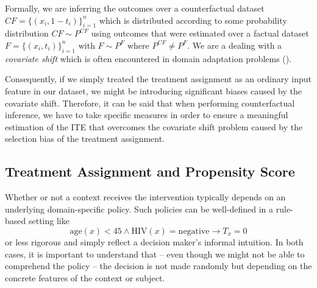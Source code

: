 
Formally, we are inferring the outcomes over a counterfactual dataset $CF = \{(x_i, 1 - t_i) \}^{n}_{i=1}$ which is distributed according to some probability distribution $CF \sim P^{CF}$ using outcomes that were estimated over a factual dataset $F = \{(x_i, t_i) \}^{n}_{i=1}$ with $F \sim P^{F}$ where $P^{CF} \neq P^F$. We are a dealing with a \emph{covariate shift} which is often encountered in domain adaptation problems (\cite{domain-adaptation}).

Consequently, if we simply treated the treatment assignment as an ordinary input feature in our dataset, we might be introducing significant biases caused by the covariate shift.  Therefore, it can be said that when performing counterfactual inference, we have to take specific measures in order to ensure a meaningful estimation of the ITE that overcomes the covariate shift problem caused by the selection bias of the treatment assignment. 


\subsection{Treatment Assignment and Propensity Score} \label{sec:propensity-score}
Whether or not a context receives the intervention typically depends on an underlying domain-specific policy. Such policies can be well-defined in  a rule-based setting like 
\begin{equation}
\text{age}(x) < 45 \wedge \text{HIV}(x) = \text{negative} \rightarrow T_x = 0
\end{equation} 
or less rigorous and simply reflect a decision maker's informal intuition. In both cases, it is important to understand that -- even though we might not be able to comprehend the policy -- the decision is not made randomly but depending on the concrete features of the context or subject. 

